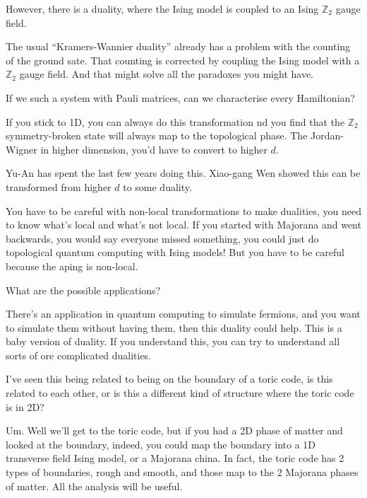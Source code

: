 However,
there is a duality,
where the Ising model is coupled to an Ising $\mathbb{Z}_2$ gauge field.

The usual ``Kramers-Wannier duality''
already has a problem with the counting of the ground sate.
That counting is corrected by coupling the Ising model with a
$\mathbb{Z}_2$ gauge field.
And that might solve all the paradoxes you might have.

\begin{question}
    If we such a system with Pauli matrices,
    can we characterise every Hamiltonian?
\end{question}
If you stick to 1D,
you can always do this transformation nd you find that the $\mathbb{Z}_2$
symmetry-broken state will always map to the topological phase.
The Jordan-Wigner in higher dimension,
you'd have to convert to higher $d$.

Yu-An has spent the last few years doing this.
Xiao-gang Wen showed this can be transformed from higher $d$ to some duality.

You have to be careful with non-local transformations to make dualities,
you need to know what's local and what's not local.
If you started with Majorana and went backwards,
you would say everyone missed something,
you could just do topological quantum computing with Ising models!
But you have to be careful because the aping is non-local.

\begin{question}
    What are the possible applications?
\end{question}
There's an application in quantum computing to simulate fermions,
and you want to simulate them without having them,
then this duality could help.
This is a baby version of duality.
If you understand this,
you can try to understand all sorts of ore complicated dualities.

\begin{question}
    I've seen this being related to being on the boundary of a toric code,
    is this related to each other,
    or is this a different kind of structure where the toric code is in 2D?
\end{question}
Um. Well we'll get to the toric code,
but if you had a 2D phase of matter and looked at the boundary,
indeed,
you could map the boundary into a 1D transverse field Ising model,
or a Majorana china.
In fact, the toric code has 2 types of boundaries,
rough and smooth,
and those map to the 2 Majorana phases of matter.
All the analysis will be useful.

